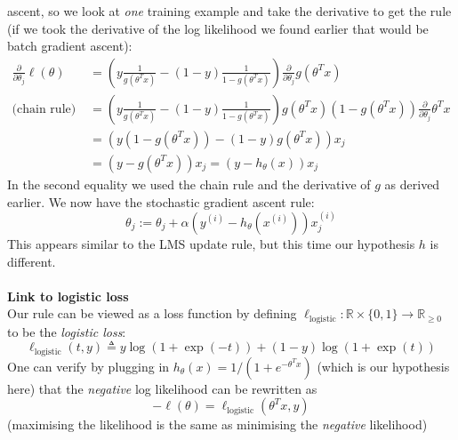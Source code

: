 \documentclass{report}
\begin{document}
ascent, so we look at \textit{one} training example and take the derivative
to get the rule (if we took the derivative of the log likelihood we found earlier that would be batch
gradient ascent):
\begin{align*}
\frac{\partial}{\partial\theta_j}\ell(\theta)
&=\left(y\frac{1}{g(\theta^Tx)}-(1-y)\frac{1}{1-g(\theta^Tx)}\right)\frac{\partial}{\partial\theta_j}g(\theta^Tx)\\
\text{(chain rule)}\quad&=\left(y\frac{1}{g(\theta^Tx)}-(1-y)\frac{1}{1-g(\theta^Tx)}\right)
g(\theta^Tx)(1-g(\theta^Tx))\frac{\partial}{\partial\theta_j}\theta^Tx\\
&=(y(1-g(\theta^Tx))-(1-y)g(\theta^Tx))x_j\\
&=(y-g(\theta^Tx))x_j=(y-h_\theta(x))x_j
\end{align*}
In the second equality we used the chain rule and the derivative of $g$ as derived earlier. We now
have the stochastic gradient ascent rule:
\begin{equation*}
\theta_j:=\theta_j+\alpha(y^{(i)}-h_\theta(x^{(i)}))x^{(i)}_j
\end{equation*}
This appears similar to the LMS update rule, but this time our hypothesis $h$ is different.\\
\vspace{1mm}\\
\textbf{Link to logistic loss}\\
Our rule can be viewed as a loss function by defining
$\ell_\text{logistic}:\mathbb{R}\times\{0,1\}\to\mathbb{R}_{\geq0}$
to be the \textit{logistic loss}:
\begin{equation*}
\ell_\text{logistic}(t,y)\triangleq y\log(1+\exp(-t))+
(1-y)\log(1+\exp(t))
\end{equation*}
One can verify by plugging in $h_\theta(x)=1/(1+e^{-\theta^Tx})$ (which is our hypothesis here)
that the \textit{negative} log likelihood can be rewritten as
\begin{equation*}
-\ell(\theta)=\ell_\text{logistic}(\theta^Tx,y)
\end{equation*}
(maximising the likelihood is the same as minimising the \textit{negative} likelihood)
\newpage
\end{document}
